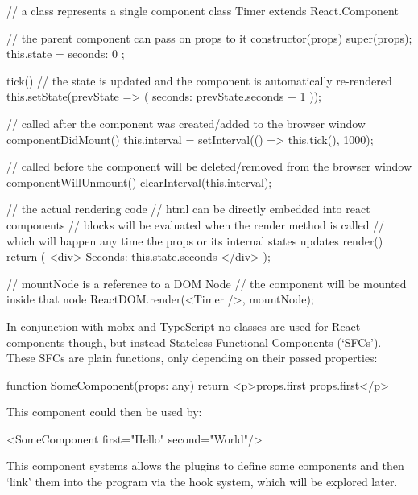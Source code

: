 \begin{typescript}
// a class represents a single component
class Timer extends React.Component {
  // the parent component can pass on props to it
  constructor(props) {
    super(props);
    this.state = { seconds: 0 };
  }

  tick() {
    //  the state is updated and the component is automatically re-rendered
    this.setState(prevState => ({
      seconds: prevState.seconds + 1
    }));
  }

  // called after the component was created/added to the browser window
  componentDidMount() {
    this.interval = setInterval(() => this.tick(), 1000);
  }

  // called before the component will be deleted/removed from the browser window
  componentWillUnmount() {
    clearInterval(this.interval);
  }

  // the actual rendering code
  // html can be directly embedded into react components
  // {} blocks will be evaluated when the render method is called
  // which will happen any time the props or its internal states updates
  render() {
    return (
      <div>
        Seconds: {this.state.seconds}
      </div>
    );
  }
}

// mountNode is a reference to a DOM Node
// the component will be mounted inside that node
ReactDOM.render(<Timer />, mountNode);
\end{typescript}
In conjunction with mobx and TypeScript no classes are used for React components
though, but instead Stateless Functional Components
(`SFCs'\cite*{ikeuchi_react_2017}). These SFCs are plain functions, only
depending on their passed properties:
\begin{typescript}
function SomeComponent(props: any) {
 return <p>{props.first} {props.first}</p>
}
\end{typescript}
This component could then be used by:
\begin{typescript}
 <SomeComponent first="Hello" second="World"/>
\end{typescript}
This component systems allows the plugins to define some components and then
`link' them into the program via the hook system, which will be explored later.

